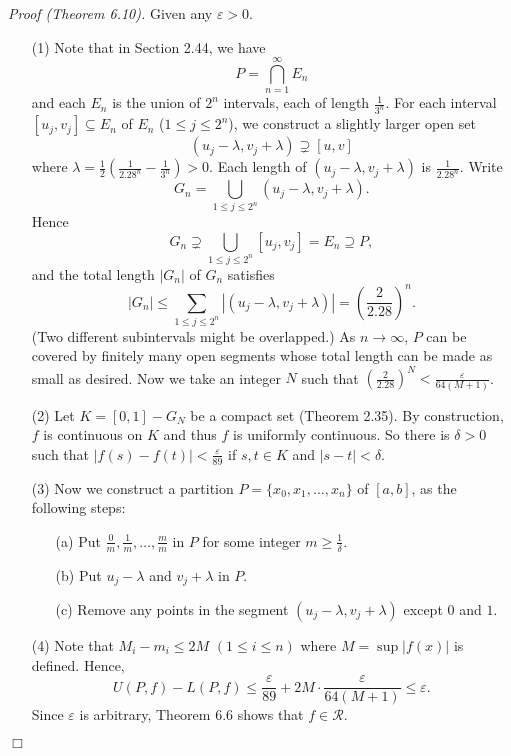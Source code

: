 \documentclass{article}
\begin{document}
\emph{Proof (Theorem 6.10).}
Given any $\varepsilon > 0$.
\begin{enumerate}
\item[(1)]
Note that in Section 2.44, we have
\[
  P = \bigcap_{n=1}^{\infty} E_n
\]
and each $E_n$ is the union of $2^n$ intervals, each of length $\frac{1}{3^n}$.
For each interval $[u_j,v_j] \subseteq E_n$ of $E_n$ ($1 \leq j \leq 2^n$),
we construct a slightly larger open set
\[
  (u_j-\lambda,v_j+\lambda) \supsetneq [u,v]
\]
where $\lambda = \frac{1}{2}\left( \frac{1}{2.28^n} - \frac{1}{3^n} \right) > 0$.
Each length of $(u_j-\lambda,v_j+\lambda)$ is $\frac{1}{2.28^n}$.
Write
\[
  G_n = \bigcup_{1 \leq j \leq 2^n} (u_j-\lambda,v_j+\lambda).
\]
Hence
\[
  G_n \supsetneq \bigcup_{1 \leq j \leq 2^n} [u_j,v_j] = E_n \supseteq P,
\]
and the total length $|G_n|$ of $G_n$ satisfies
\[
  |G_n|
  \leq \sum_{1 \leq j \leq 2^n} |(u_j-\lambda,v_j+\lambda)|
  = \left(\frac{2}{2.28}\right)^n.
\]
(Two different subintervals might be overlapped.)
As $n \to \infty$, $P$ can be covered by finitely many open segments
whose total length can be made as small as desired.
Now we take an integer $N$ such that
$\left(\frac{2}{2.28}\right)^N < \frac{\varepsilon}{64(M+1)}$.

\item[(2)]
Let $K = [0,1] - G_N$ be a compact set (Theorem 2.35).
By construction, $f$ is continuous on $K$ and thus $f$ is uniformly continuous.
So there is $\delta > 0$ such that $|f(s) - f(t)| < \frac{\varepsilon}{89}$
if $s, t \in K$ and $|s-t| < \delta$.

\item[(3)]
Now we construct a partition $P = \{x_0, x_1, \ldots, x_n\}$ of $[a,b]$,
as the following steps:
  \begin{enumerate}
  \item[(a)]
  Put $\frac{0}{m}, \frac{1}{m}, \ldots, \frac{m}{m}$
  in $P$ for some integer $m \geq \frac{1}{\delta}$.

  \item[(b)]
  Put $u_j-\lambda$ and $v_j+\lambda$ in $P$.

  \item[(c)]
  Remove any points in the segment $(u_j-\lambda,v_j+\lambda)$
  except $0$ and $1$.
  \end{enumerate}

\item[(4)]
  Note that $M_i - m_i \leq 2M$ $(1 \leq i \leq n)$ where $M = \sup|f(x)|$ is defined.
  Hence,
  \[
    U(P,f) - L(P,f)
    \leq \frac{\varepsilon}{89} + 2M \cdot \frac{\varepsilon}{64(M+1)}
    \leq \varepsilon.
  \]
  Since $\varepsilon$ is arbitrary, Theorem 6.6 shows that $f \in \mathscr{R}$.
\end{enumerate}
$\Box$ \\
\end{document}
